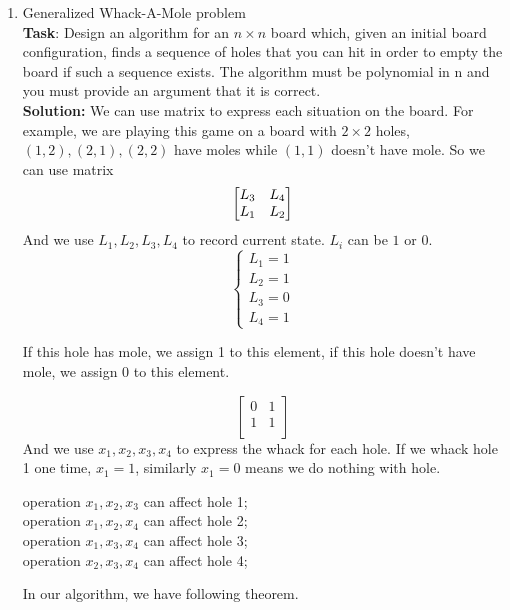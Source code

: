\documentclass[A4,12pt]{article}
\begin{document}
\begin{enumerate}[6.]
\begin{enumerate}[8.]
\begin{enumerate}[9.]
  \item Generalized Whack-A-Mole problem\\

  \textbf{Task}: Design an algorithm for an $n\times n$ board which, given an initial board configuration, finds a sequence of holes that you can hit in order to empty the board if such a sequence exists. The algorithm must be polynomial in n and you must provide an argument that it is correct.\\

  \textbf{Solution:} We can use matrix to express each situation on the board. For example, we are playing this game on a board with $2\times 2$ holes, $(1,2), (2,1), (2,2)$ have moles while $(1,1)$ doesn't have mole. So we can use matrix
  \[ \begin{bmatrix}
  $$
    L_3 & L_4   \\
    L_1 & L_2
  $$
  \end{bmatrix}
  \]
  And we use $L_1, L_2, L_3, L_4$ to record current state.
  $L_i$ can be $1$ or $0$.
  \begin{equation}
    \left\{
    \begin{array}{lr}
      L_1=1\\
      L_2=1\\
      L_3=0\\
      L_4=1
    \end{array}
    \right.
  \end{equation}


If this hole has mole, we assign 1 to this element, if this hole doesn't have mole, we assign 0 to this element.

    \[ \begin{bmatrix}
  0 & 1   \\
    1 & 1   \\
  \end{bmatrix}
  \]
  And we use $x_1, x_2, x_3, x_4$ to express the whack for each hole. If we whack hole 1 one time, $x_1 = 1$, similarly $x_1 = 0$ means we do nothing with hole.

operation $x_1, x_2, x_3$ can affect hole 1;\\
operation $x_1, x_2, x_4$ can affect hole 2;\\
operation $x_1, x_3, x_4$ can affect hole 3;\\
operation $x_2, x_3, x_4$ can affect hole 4;

In our algorithm, we have following theorem.


\end{enumerate}
\end{enumerate}
\end{enumerate}
\end{document}
